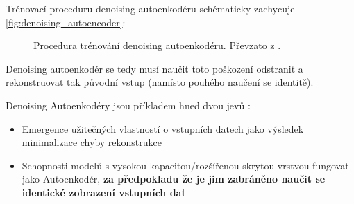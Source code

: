 Trénovací proceduru denoising autoenkodéru schématicky zachycuje \autoref{fig:denoising_autoencoder}:

\begin{figure}[H]
    \centering
    \caption{Procedura trénování denoising autoenkodéru. Převzato z \textcite{Goodfellow2016}.}
    \label{fig:denoising_autoencoder}
\end{figure}

Denoising autoenkodér se tedy musí naučit toto poškození odstranit a rekonstruovat tak původní vstup (namísto pouhého naučení se identitě).

Denoising Autoenkodéry jsou příkladem hned dvou jevů \cite{Charte2018}:
\begin{itemize}
    \item Emergence užitečných vlastností o vstupních datech jako výsledek minimalizace chyby rekonstrukce
    \item Schopnosti modelů s vysokou kapacitou/rozšířenou skrytou vrstvou fungovat jako Autoenkodér, \textbf{za předpokladu že je jim zabráněno naučit se identické zobrazení vstupních dat}
\end{itemize}